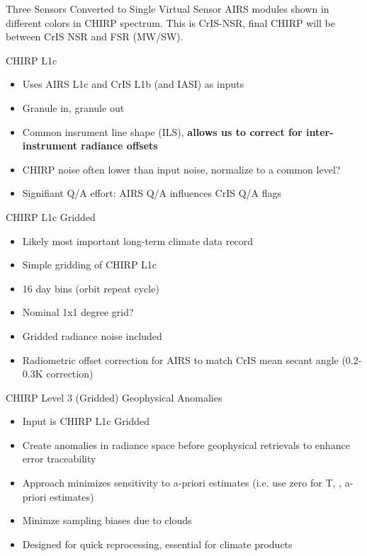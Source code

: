 \documentclass[10pt,t]{beamer}
\begin{document}
\begin{frame}[label={sec:orga0cbe7d}]{Three Sensors Converted to Single Virtual Sensor}
AIRS modules shown in different colors in CHIRP spectrum. This is CrIS-NSR, final CHIRP will be between CrIS NSR and FSR (MW/SW).
\end{frame}

\begin{frame}[label={sec:orgacd4c0d}]{CHIRP L1c}
\begin{itemize}
\item Uses AIRS L1c and CrIS L1b (and IASI) as inputs
\item Granule in, granule out
\item Common insrument line shape (ILS), \textbf{allows us to correct for inter-instrument radiance offsets}
\item CHIRP noise often lower than input noise, normalize to a common level?
\item Signifiant Q/A effort: AIRS Q/A influences CrIS Q/A flags
\end{itemize}
\end{frame}

\begin{frame}[label={sec:org195f52e}]{CHIRP L1c Gridded}
\begin{itemize}
\item Likely most important long-term climate data record
\item Simple gridding of CHIRP L1c
\item 16 day bins (orbit repeat cycle)
\item Nominal 1x1 degree grid?
\item Gridded radiance noise included
\item Radiometric offset correction for AIRS to match CrIS mean secant angle (0.2-0.3K correction)
\end{itemize}
\end{frame}

\begin{frame}[label={sec:org3614f62}]{CHIRP Level 3 (Gridded) Geophysical Anomalies}
\begin{itemize}
\item Input is CHIRP L1c Gridded
\item Create anomalies in radiance space before geophysical retrievals to enhance error  traceability
\item Approach minimizes sensitivity to a-priori estimates (i.e. use zero for T, \water, \ozone a-priori estimates)
\item Minimze sampling biases due to clouds
\item Designed for quick reprocessing, essential for climate products
\end{itemize}
\end{frame}
\end{document}
